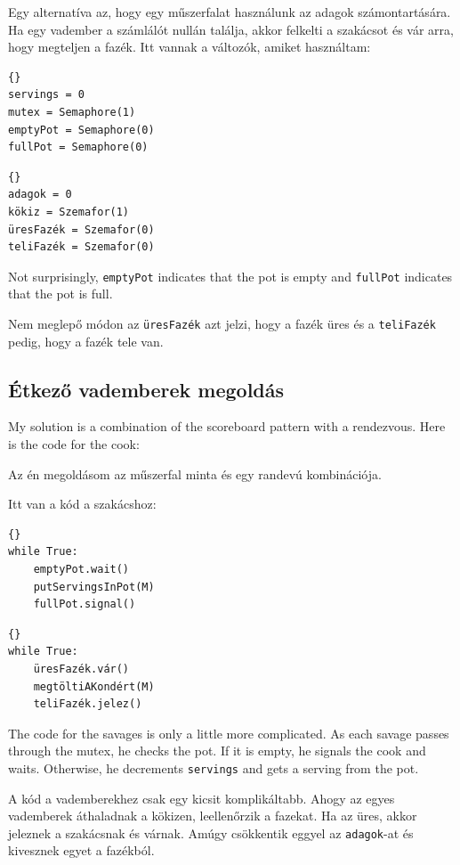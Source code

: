 \documentclass{book}
\newcommand{\clearemptydoublepage}{\newpage\cleardoublepage}
\begin{document}
Egy alternatíva az, hogy egy műszerfalat használunk az
adagok számontartására. Ha egy vadember a számlálót nullán
találja, akkor felkelti a szakácsot és vár arra, hogy
megteljen a fazék. Itt vannak a változók, amiket használtam:
	
\begin{lstlisting}[title={Dining Savages hint}]{}
servings = 0
mutex = Semaphore(1)
emptyPot = Semaphore(0)
fullPot = Semaphore(0)
\end{lstlisting}

\begin{lstlisting}[title={Étkező vademberek tipp}]{}
adagok = 0
kökiz = Szemafor(1)
üresFazék = Szemafor(0)
teliFazék = Szemafor(0)
\end{lstlisting}

Not surprisingly, {\tt emptyPot} indicates that the pot is empty and
{\tt fullPot} indicates that the pot is full.

Nem meglepő módon az {\tt üresFazék} azt jelzi, hogy
a fazék üres és a {\tt teliFazék} pedig, hogy a fazék tele van.

\clearemptydoublepage
\subsection{Étkező vademberek megoldás}

My solution is a combination of the scoreboard pattern
with a rendezvous.
Here is the code for the cook:

Az én megoldásom az műszerfal minta és egy randevú kombinációja.

Itt van a kód a szakácshoz:

\begin{lstlisting}[title={Dining Savages solution (cook)}]{}
while True:
    emptyPot.wait()
    putServingsInPot(M)
    fullPot.signal()
\end{lstlisting}

\begin{lstlisting}[title={Étkező vademberek megoldás (szakács)}]{}
while True:
    üresFazék.vár()
    megtöltiAKondért(M)
    teliFazék.jelez()
\end{lstlisting}

The code for the savages is only a little more complicated.
As each savage passes through the mutex, he checks the pot.
If it is empty, he signals the cook and waits.  Otherwise,
he decrements {\tt servings} and gets a serving from the pot.

A kód a vademberekhez csak egy kicsit komplikáltabb.
Ahogy az egyes vademberek áthaladnak a kökizen, leellenőrzik
a fazekat. Ha az üres, akkor jeleznek a szakácsnak és várnak. Amúgy
csökkentik eggyel az {\tt adagok}-at és kivesznek egyet a fazékból.
\end{document}
